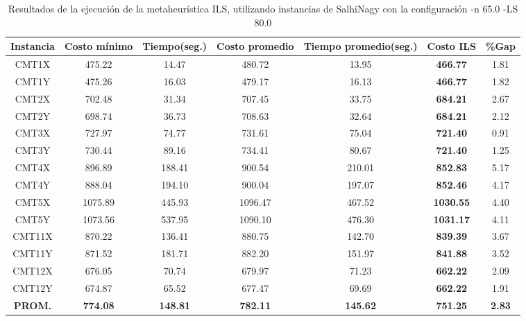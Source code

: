 \begin{table}[ht]
\caption{Resultados de la ejecución de la metaheurística ILS, utilizando instancias de SalhiNagy con la configuración -n 65.0 -LS 80.0}
\centering
\small
\begin{tabular}{c c c c c c c}
\hline\hline
Instancia & Costo mínimo & Tiempo(seg.) & Costo promedio & Tiempo promedio(seg.) & Costo ILS & \%Gap \\ [0.5ex]
\hline
CMT1X & 475.22 & 14.47 & 
480.72 & 13.95 & \bf{466.77} & 
1.81\\CMT1Y & 475.26 & 16.03 & 
479.17 & 16.13 & \bf{466.77} & 
1.82\\CMT2X & 702.48 & 31.34 & 
707.45 & 33.75 & \bf{684.21} & 
2.67\\CMT2Y & 698.74 & 36.73 & 
708.63 & 32.64 & \bf{684.21} & 
2.12\\CMT3X & 727.97 & 74.77 & 
731.61 & 75.04 & \bf{721.40} & 
0.91\\CMT3Y & 730.44 & 89.16 & 
734.41 & 80.67 & \bf{721.40} & 
1.25\\CMT4X & 896.89 & 188.41 & 
900.54 & 210.01 & \bf{852.83} & 
5.17\\CMT4Y & 888.04 & 194.10 & 
900.04 & 197.07 & \bf{852.46} & 
4.17\\CMT5X & 1075.89 & 445.93 & 
1096.47 & 467.52 & \bf{1030.55} & 
4.40\\CMT5Y & 1073.56 & 537.95 & 
1090.10 & 476.30 & \bf{1031.17} & 
4.11\\CMT11X & 870.22 & 136.41 & 
880.75 & 142.70 & \bf{839.39} & 
3.67\\CMT11Y & 871.52 & 181.71 & 
882.20 & 151.97 & \bf{841.88} & 
3.52\\CMT12X & 676.05 & 70.74 & 
679.97 & 71.23 & \bf{662.22} & 
2.09\\CMT12Y & 674.87 & 65.52 & 
677.47 & 69.69 & \bf{662.22} & 
1.91\\\bf{PROM.} & 
\bf{774.08} & \bf{148.81} & \bf{782.11} & \bf{145.62} & \bf{751.25} & \bf{2.83}\\[1ex]\hline
\end{tabular}
\label{table:nonlin}
\end{table} \clearpage

